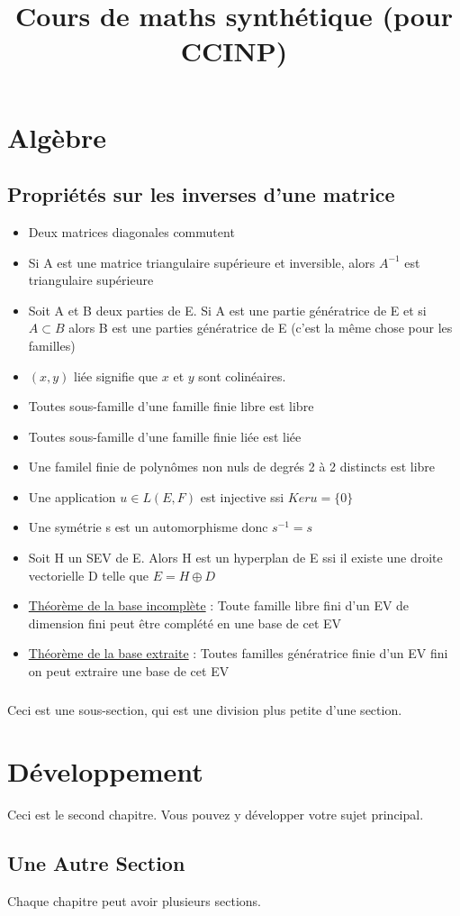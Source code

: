 \documentclass{book}
\title{Cours de maths synthétique (pour CCINP)}
\begin{document}
\maketitle

\tableofcontents

\chapter{Algèbre}

\section{Propriétés sur les inverses d'une matrice}

\begin{itemize}[label=$\ast$]
    	\item Deux matrices diagonales commutent
    	\item Si A est une matrice triangulaire supérieure et inversible, alors $A^{-1}$ est triangulaire supérieure
	\item Soit A et B deux parties de E. Si A est une partie génératrice de E et si \( A \subset B \) alors B est une parties génératrice de E (c'est la même chose pour les familles)
	\item \( (x,y) \) liée signifie que \( x \) et \( y \) sont colinéaires.
	\item Toutes sous-famille d'une famille finie libre est libre
	\item Toutes sous-famille d'une famille finie liée est liée
	\item Une familel finie de polynômes non nuls de degrés 2 à 2 distincts est libre
	\item Une application \(u \in L(E,F) \) est injective ssi \(Ker u = \{0\} \)
	\item Une symétrie s est un automorphisme donc \(s^{-1} = s \)
	\item Soit H un SEV de E. Alors H est un hyperplan de E ssi il existe une droite vectorielle D telle que \(E = H \oplus D \)
	\item \underline{Théorème de la base incomplète} : Toute famille libre fini d'un EV de dimension fini peut être complété en une base de cet EV
	\item \underline{Théorème de la base extraite} : Toutes familles génératrice finie d'un EV fini on peut extraire une base de cet EV
\end{itemize}

\subsection{}

Ceci est une sous-section, qui est une division plus petite d'une section.

\chapter{Développement}

Ceci est le second chapitre. Vous pouvez y développer votre sujet principal.

\section{Une Autre Section}

Chaque chapitre peut avoir plusieurs sections.
\end{document}
